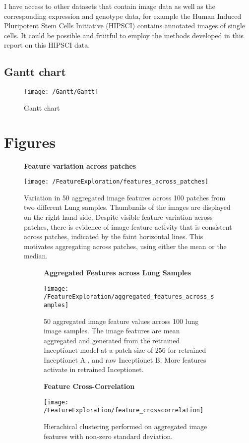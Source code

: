 \documentclass[graybox]{svmult}
\newcommand*{\figuretitle}[1]{%
    {\centering%
    \textbf{#1}%
    \par\medskip}%
}
\begin{document}
I have access to other datasets that contain image data as well as the corresponding expression and genotype data, for example the Human Induced Pluripotent Stem Cells Initiative (HIPSCI) \cite{hipsci-project} contains annotated images of single cells. It could be possible and fruitful to employ the methods developed in this report on this HIPSCI data.

\subsection{Gantt chart}



\begin{figure}[H]
\centering
\texttt{[image: /Gantt/Gantt]}
\caption{Gantt chart}
\label{fig:gantt}
\end{figure}


\section{Figures}

\begin{figure}[H]
\figuretitle{Feature variation across patches}
\centering
\texttt{[image: /FeatureExploration/features\_across\_patches]}
\caption{Variation in 50 aggregated image features across 100 patches from two different Lung samples. Thumbnails of the images are displayed on the right hand side. Despite visible feature variation across patches, there is evidence of image feature activity that is consistent across patches, indicated by the faint horizontal lines. This motivates aggregating across patches, using either the mean or the median.}
\label{fig:features_across_patches}
\end{figure}

\begin{figure}[H]

\begin{subfigure}{0.45\textwidth}
\figuretitle{Aggregated Features across Lung Samples}
\texttt{[image: /FeatureExploration/aggregated\_features\_across\_samples]} 
\caption{50 aggregated image feature values across 100 lung image samples. The image features are mean aggregated and generated from the retrained Inceptionet model at a patch size of $256$ for retrained Inceptionet \textcolor{ao(english)}{A} , and raw Inceptionet \textcolor{ao(english)}{B}. More features activate in retrained Inceptionet.}
\label{fig:aggregated_features_across_samples}
\end{subfigure}
\hfill
\begin{subfigure}{0.45\textwidth}
\figuretitle{Feature Cross-Correlation}
\texttt{[image: /FeatureExploration/feature\_crosscorrelation]}
\caption{Hierachical clustering performed on aggregated image features with non-zero standard deviation.}
\label{fig:feature_crosscorrelation}
\end{subfigure}

\caption{ }

\end{figure}
\end{document}
